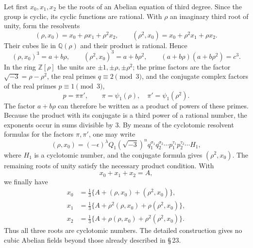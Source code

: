 \documentclass[11pt]{article}
\begin{document}
Let first $x_0,x_1,x_2$ be the roots of an Abelian equation of third degree.  Since the group is cyclic, its cyclic functions are rational.  With $\rho$ an imaginary third root of unity, form the resolvents
\begin{equation}
  (\rho,x_0)=x_0+\rho x_1+\rho^2x_2,
  \qquad
  (\rho^2,x_0)=x_0+\rho^2x_1+\rho x_2.
  \tag{1}
\end{equation}
Their cubes lie in $\mathbb Q(\rho)$ and their product is rational.  Hence
\begin{equation}
   (\rho,x_0)^3=a+b\rho,
   \qquad
   (\rho^2,x_0)^3=a+b\rho^2,
   \qquad
   (a+b\rho)(a+b\rho^2)=c^3 .
   \tag{2}
\end{equation}
In the ring $\mathbb Z[\rho]$ the units are $\pm1,\pm\rho,\pm\rho^2$; the prime factors are the factor $\sqrt{-3}=\rho-\rho^2$, the real primes $q\equiv2\pmod3$, and the conjugate complex factors of the real primes $p\equiv1\pmod3$,
\begin{equation}
   p=\pi\pi',
   \qquad
   \pi=\psi_1(\rho),
   \quad
   \pi'=\psi_1(\rho^2).
   \tag{3}
\end{equation}
The factor $a+b\rho$ can therefore be written as a product of powers of these primes.  Because the product with its conjugate is a third power of a rational number, the exponents occur in sums divisible by $3$.  By means of the cyclotomic resolvent formulas for the factors $\pi,\pi'$, one may write
\begin{equation}
   (\rho,x_0)=(-\epsilon)^\lambda Q_1
   (\sqrt{-3})^n q_1^{\sigma_1}q_2^{\sigma_2}\cdots
   p_1^{\tau_1}p_2^{\tau_2}\cdots H_1,
   \tag{4}
\end{equation}
where $H_1$ is a cyclotomic number, and the conjugate formula gives $(\rho^2,x_0)$.  The remaining roots of unity satisfy the necessary product condition.  With
\begin{equation}
   x_0+x_1+x_2=A,
   \tag{5}
\end{equation}
we finally have
\begin{equation}
\begin{aligned}
 x_0&=\frac13\{A+(\rho,x_0)+(\rho^2,x_0)\},\\
 x_1&=\frac13\{A+\rho^2(\rho,x_0)+\rho(\rho^2,x_0)\},\\
 x_2&=\frac13\{A+\rho(\rho,x_0)+\rho^2(\rho^2,x_0)\}.
\end{aligned}
\tag{6}
\end{equation}
Thus all three roots are cyclotomic numbers.  The detailed construction gives no cubic Abelian fields beyond those already described in \S\,23.
\end{document}
